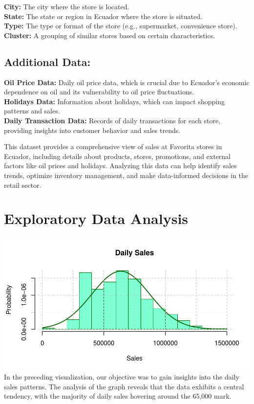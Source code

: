 \documentclass[
]{article}
\begin{document}
\textbf{City:} The city where the store is located.\\
\textbf{State:} The state or region in Ecuador where the store is
situated.\\
\textbf{Type:} The type or format of the store (e.g., supermarket,
convenience store).\\
\textbf{Cluster:} A grouping of similar stores based on certain
characteristics.

\hypertarget{additional-data}{%
\subsection{Additional Data:}\label{additional-data}}

\textbf{Oil Price Data:} Daily oil price data, which is crucial due to
Ecuador's economic dependence on oil and its vulnerability to oil price
fluctuations.\\
\textbf{Holidays Data:} Information about holidays, which can impact
shopping patterns and sales.\\
\textbf{Daily Transaction Data:} Records of daily transactions for each
store, providing insights into customer behavior and sales trends.

This dataset provides a comprehensive view of sales at Favorita stores
in Ecuador, including details about products, stores, promotions, and
external factors like oil prices and holidays. Analyzing this data can
help identify sales trends, optimize inventory management, and make
data-informed decisions in the retail sector.

\hypertarget{exploratory-data-analysis}{%
\section{Exploratory Data Analysis}\label{exploratory-data-analysis}}

\includegraphics{Visualisation-Project_files/figure-latex/unnamed-chunk-1-1.pdf}
In the preceding visualization, our objective was to gain insights into
the daily sales patterns. The analysis of the graph reveals that the
data exhibits a central tendency, with the majority of daily sales
hovering around the 65,000 mark.
\end{document}
